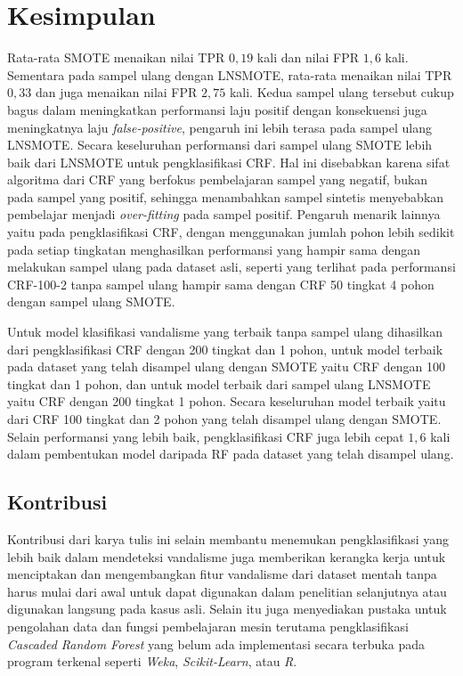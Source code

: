 \chapter{Kesimpulan}

Rata-rata SMOTE menaikan nilai TPR $0,19$ kali dan nilai FPR $1,6$ kali.
Sementara pada sampel ulang dengan LNSMOTE, rata-rata menaikan nilai TPR $0,33$
dan juga menaikan nilai FPR $2,75$ kali.
Kedua sampel ulang tersebut cukup bagus dalam meningkatkan performansi laju
positif dengan konsekuensi juga meningkatnya laju \textit{false-positive},
pengaruh ini lebih terasa pada sampel ulang LNSMOTE.
Secara keseluruhan performansi dari sampel ulang SMOTE lebih baik dari
LNSMOTE untuk pengklasifikasi CRF.
Hal ini disebabkan karena sifat algoritma dari CRF yang berfokus pembelajaran
sampel yang negatif, bukan pada sampel yang positif, sehingga menambahkan
sampel sintetis menyebabkan pembelajar menjadi \textit{over-fitting} pada
sampel positif.
Pengaruh menarik lainnya yaitu pada pengklasifikasi CRF, dengan menggunakan
jumlah pohon lebih sedikit pada setiap tingkatan menghasilkan performansi yang
hampir sama dengan melakukan sampel ulang pada dataset asli, seperti yang
terlihat pada performansi CRF-100-2 tanpa sampel ulang hampir sama dengan CRF
50 tingkat 4 pohon dengan sampel ulang SMOTE.

Untuk model klasifikasi vandalisme yang terbaik tanpa sampel ulang dihasilkan
dari pengklasifikasi CRF dengan 200 tingkat dan 1 pohon, untuk model terbaik
pada dataset yang telah disampel ulang dengan SMOTE yaitu CRF dengan 100
tingkat dan 1 pohon, dan untuk model terbaik dari sampel ulang LNSMOTE yaitu
CRF dengan 200 tingkat 1 pohon. Secara keseluruhan model terbaik yaitu dari CRF
100 tingkat dan 2 pohon yang telah disampel ulang dengan SMOTE.
Selain performansi yang lebih baik, pengklasifikasi CRF juga lebih cepat $1,6$
kali dalam pembentukan model daripada RF pada dataset yang telah disampel
ulang.

\section{Kontribusi}

Kontribusi dari karya tulis ini selain membantu menemukan pengklasifikasi yang
lebih baik dalam mendeteksi vandalisme juga memberikan kerangka kerja untuk
menciptakan dan mengembangkan fitur vandalisme dari dataset mentah tanpa harus
mulai dari awal untuk dapat digunakan dalam penelitian selanjutnya atau
digunakan langsung pada kasus asli. Selain itu juga menyediakan pustaka untuk
pengolahan data dan fungsi pembelajaran mesin terutama pengklasifikasi
\textit{Cascaded Random Forest} yang belum ada implementasi secara terbuka pada
program terkenal seperti \textit{Weka}, \textit{Scikit-Learn}, atau \textit{R}.

